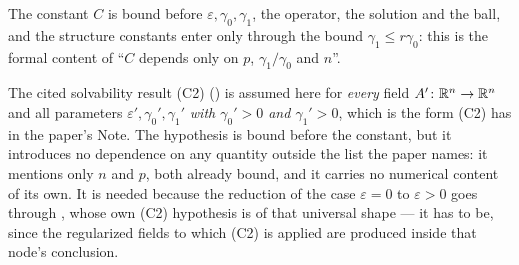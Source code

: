 \begin{theorem}[Theorem 1]
The constant $C$ is bound before $\varepsilon,\gamma_0,\gamma_1$, the operator,
the solution and the ball, and the structure constants enter only through the
bound $\gamma_1\le r\gamma_0$: this is the formal content of ``$C$ depends only
on $p$, $\gamma_1/\gamma_0$ and $n$''.

The cited solvability result (C2) () is assumed here
for \emph{every} field $A'\colon\mathbb{R}^n\to\mathbb{R}^n$ and all parameters
$\varepsilon',\gamma_0',\gamma_1'$ \emph{with $\gamma_0'>0$ and $\gamma_1'>0$},
which is the form (C2) has in the paper's Note.  The hypothesis is bound before the constant, but it introduces no
dependence on any quantity outside the list the paper names: it mentions only
$n$ and $p$, both already bound, and it carries no numerical content of its own.
It is needed because the reduction of the case $\varepsilon=0$ to
$\varepsilon>0$ goes through , whose own (C2)
hypothesis is of that universal shape --- it has to be, since the regularized
fields to which (C2) is applied are produced inside that node's conclusion.


\end{theorem}
